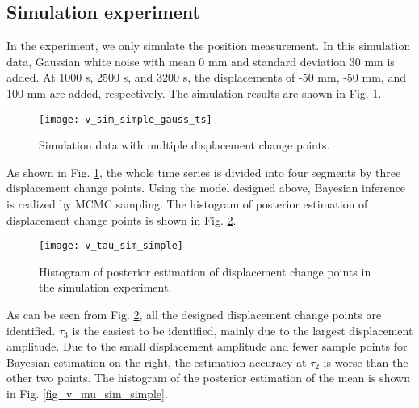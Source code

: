 \documentclass{svjour3}                     %
\begin{document}
\subsection{Simulation experiment}
In the experiment, we only simulate the position measurement. In this simulation data, Gaussian white noise with mean 0 mm and standard deviation 30 mm is added. At 1000 s, 2500 s, and 3200 s, the displacements of -50 mm, -50 mm, and 100 mm are added, respectively. The simulation results are shown in Fig. \ref{fig_v_sim_simple_gauss_ts}.

\begin{figure}[htbp]
	\centering
	\texttt{[image: v\_sim\_simple\_gauss\_ts]}
	\caption{Simulation data with multiple displacement change points.}
	\label{fig_v_sim_simple_gauss_ts}
\end{figure} 
As shown in Fig. \ref{fig_v_sim_simple_gauss_ts}, the whole time series is divided into four segments by three displacement change points. Using the model designed above, Bayesian inference is realized by MCMC sampling. The histogram of posterior estimation of displacement change points is shown in Fig. \ref{fig_v_tau_sim_simple}.

\begin{figure}[htbp]
	\centering
	\texttt{[image: v\_tau\_sim\_simple]}
	\caption{Histogram of posterior estimation of displacement change points in the simulation experiment.}
	\label{fig_v_tau_sim_simple}
\end{figure} 
As can be seen from Fig. \ref{fig_v_tau_sim_simple}, all the designed displacement change points are identified. $\tau_3$ is the easiest to be identified, mainly due to the largest displacement amplitude. Due to the small displacement amplitude and fewer sample points for Bayesian estimation on the right, the estimation accuracy at $\tau_2$ is worse than the other two points. The histogram of the posterior estimation of the mean is shown in Fig. \ref{fig_v_mu_sim_simple}.
\end{document}

